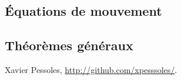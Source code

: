 \begin{definition} ~\\
\lipsum[1]
\end{definition}

\begin{rem}
\lipsum[1]
\end{rem}


\subsection{Équations de mouvement}
\begin{exemple}

\lipsum[1]

\end{exemple}

\begin{demo}
\lipsum[1]
\end{demo}


\begin{term}
\lipsum[1]
\end{term}

\begin{py}
\lipsum[1]
\end{py}



\subsection{Théorèmes généraux}



\begin{theorem}
			
\end{theorem}

\begin{rem}
\lipsum[1]
\end{rem}

\begin{warn}
\lipsum[1]
\end{warn}

\begin{methode}
\lipsum[1]
\end{methode}


\begin{savoir}
\lipsum[1]
\end{savoir}


\begin{corrige}
\lipsum[1]
\end{corrige}

\begin{thebibliography}{2}
    Xavier Pessoles, \url{http://github.com/xpesssoles/}.
\end{thebibliography}

%




